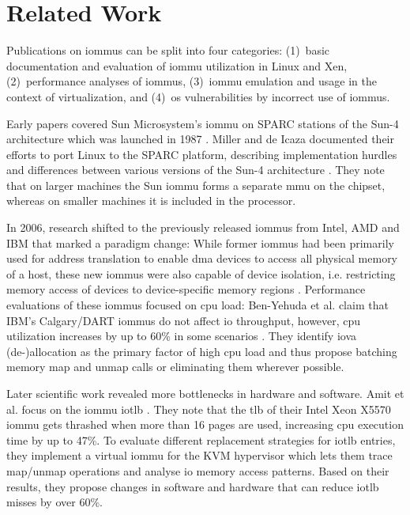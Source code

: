 \chapter{Related Work}
\label{chap:related_work}

Publications on \acp{iommu} can be split into four categories:
(1)~basic documentation and evaluation of \ac{iommu} utilization in Linux and
   Xen,
(2)~performance analyses of \acp{iommu},
(3)~\ac{iommu} emulation and usage in the context of virtualization, and
(4)~\ac{os} vulnerabilities by incorrect use of \acp{iommu}.

Early papers covered Sun Microsystem's \ac{iommu} on SPARC stations of the Sun-4
architecture which was launched in 1987 \cite{miller1996linux,
kunisawa1997gigabit}.
Miller and de Icaza documented their efforts to port Linux to the SPARC
platform, describing implementation hurdles and differences between various
versions of the Sun-4 architecture \cite{miller1996linux}. They note that on
larger machines the Sun \ac{iommu} forms a separate \ac{mmu} on the chipset,
whereas on smaller machines it is included in the processor.

In 2006, research shifted to the previously released \acp{iommu} from Intel, AMD
and IBM that marked a paradigm change: While former \acp{iommu} had been
primarily used for address translation to enable \ac{dma} devices to access all
physical memory of a host, these new \acp{iommu} were also capable of device
isolation, i.e. restricting memory access of devices to device-specific memory
regions \cite{ben2006utilizing}. Performance evaluations of these \acp{iommu}
focused on \ac{cpu} load: Ben-Yehuda et al. claim that IBM's Calgary/DART
\acp{iommu} do not affect \ac{io} throughput, however, \ac{cpu} utilization
increases by up to 60\% in some scenarios \cite{ben2007price}. They identify
\ac{iova} (de-)allocation as the primary factor of high \ac{cpu} load and thus
propose batching memory map and unmap calls or eliminating them wherever
possible.

Later scientific work revealed more bottlenecks in hardware and software. Amit
et al. focus on the \ac{iommu} \ac{iotlb} \cite{amit2010iommu}. They note that
the \ac{tlb} of their Intel Xeon X5570 \ac{iommu} gets thrashed when more than
16 pages are used, increasing \ac{cpu} execution time by up to 47\%. To evaluate
different replacement strategies for \ac{iotlb} entries, they implement a
virtual \ac{iommu} for the KVM hypervisor which lets them trace map/unmap
operations and analyse \ac{io} memory access patterns. Based on their results,
they propose changes in software and hardware that can reduce \ac{iotlb} misses
by over 60\%.

